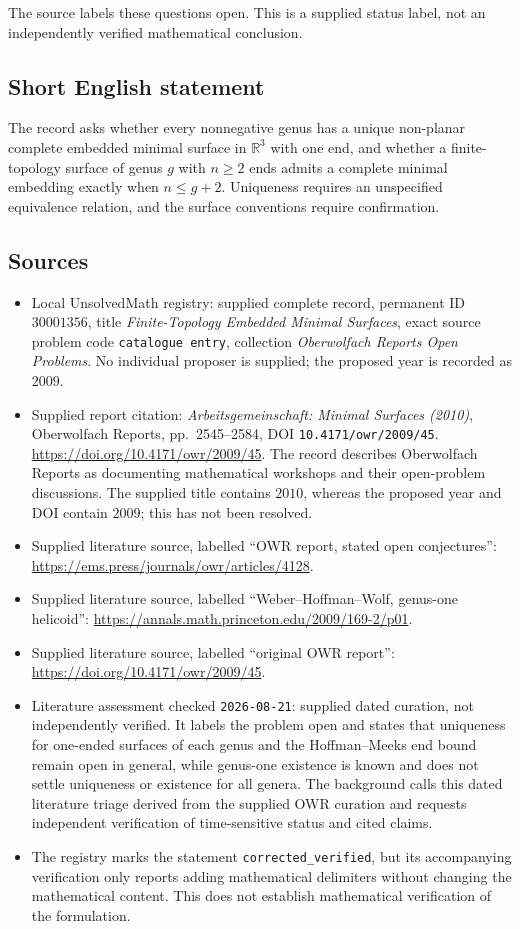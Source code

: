 \documentclass[11pt]{article}
\newcommand{\R}{\mathbb{R}}
\begin{document}
The source labels these questions open. This is a supplied status label, not an independently verified mathematical conclusion.
\subsection{Short English statement}
The record asks whether every nonnegative genus has a unique non-planar complete embedded minimal surface in \(\R^3\) with one end, and whether a finite-topology surface of genus \(g\) with \(n\geq2\) ends admits a complete minimal embedding exactly when \(n\leq g+2\). Uniqueness requires an unspecified equivalence relation, and the surface conventions require confirmation.
\subsection{Sources}
\begin{itemize}
\item Local UnsolvedMath registry: supplied complete record, permanent ID \(30001356\), title \emph{Finite-Topology Embedded Minimal Surfaces}, exact source problem code \texttt{catalogue entry}, collection \emph{Oberwolfach Reports Open Problems}. No individual proposer is supplied; the proposed year is recorded as \(2009\).
\item Supplied report citation: \emph{Arbeitsgemeinschaft: Minimal Surfaces (2010)}, Oberwolfach Reports, pp.~2545--2584, DOI \texttt{10.4171/owr/2009/45}. \url{https://doi.org/10.4171/owr/2009/45}. The record describes Oberwolfach Reports as documenting mathematical workshops and their open-problem discussions. The supplied title contains \(2010\), whereas the proposed year and DOI contain \(2009\); this has not been resolved.
\item Supplied literature source, labelled ``OWR report, stated open conjectures'': \url{https://ems.press/journals/owr/articles/4128}.
\item Supplied literature source, labelled ``Weber--Hoffman--Wolf, genus-one helicoid'': \url{https://annals.math.princeton.edu/2009/169-2/p01}.
\item Supplied literature source, labelled ``original OWR report'': \url{https://doi.org/10.4171/owr/2009/45}.
\item Literature assessment checked \texttt{2026-08-21}: supplied dated curation, not independently verified. It labels the problem open and states that uniqueness for one-ended surfaces of each genus and the Hoffman--Meeks end bound remain open in general, while genus-one existence is known and does not settle uniqueness or existence for all genera. The background calls this dated literature triage derived from the supplied OWR curation and requests independent verification of time-sensitive status and cited claims.
\item The registry marks the statement \texttt{corrected\_verified}, but its accompanying verification only reports adding mathematical delimiters without changing the mathematical content. This does not establish mathematical verification of the formulation.
\end{itemize}
\end{document}
